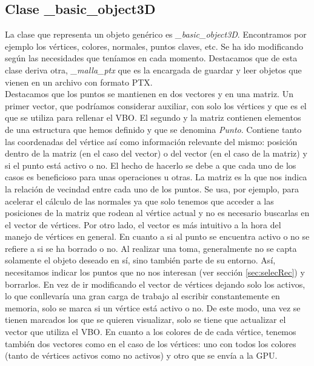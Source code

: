 \subsection{Clase \_basic\_object3D}
La clase que representa un objeto genérico es \textit{\_basic\_object3D}. Encontramos por ejemplo los vértices, colores, normales, puntos claves, etc. Se ha ido modificando según las necesidades que teníamos en cada momento. Destacamos que de esta clase deriva otra, \textit{\_malla\_ptx} que es la encargada de guardar y leer objetos que vienen en un archivo con formato PTX. \\

Destacamos que los puntos se mantienen en dos vectores y en una matriz. Un primer vector, que podríamos considerar auxiliar, con solo los vértices y que es el que se utiliza para rellenar el VBO. El segundo y la matriz contienen elementos de una estructura que hemos definido y que se denomina \textit{Punto}. Contiene tanto las coordenadas del vértice así como información relevante del mismo: posición dentro de la matriz (en el caso del vector) o del vector (en el caso de la matriz) y si el punto está activo o no. El hecho de hacerlo se debe a que cada uno de los casos es beneficioso para unas operaciones u otras. La matriz es la que nos indica la relación de vecindad entre cada uno de los puntos. Se usa, por ejemplo, para acelerar el cálculo de las normales ya que solo tenemos que acceder a las posiciones de la matriz que rodean al vértice actual y no es necesario buscarlas en el vector de vértices. Por otro lado, el vector es más intuitivo a la hora del manejo de vértices en general. En cuanto a si al punto se encuentra activo o no se refiere a si se ha borrado o no. Al realizar una toma, generalmente no se capta solamente el objeto deseado en sí, sino también parte de su entorno. Así, necesitamos indicar los puntos que no nos interesan (ver sección \ref{sec:selecRec}) y borrarlos. En vez de ir modificando el vector de vértices dejando solo los activos, lo que conllevaría una gran carga de trabajo al escribir constantemente en memoria, solo se marca si un vértice está activo o no. De este modo, una vez se tienen marcados los que se quieren visualizar, solo se tiene que actualizar el vector que utiliza el VBO. En cuanto a los colores de de cada vértice, tenemos también dos vectores como en el caso de los vértices: uno con todos los colores (tanto de vértices activos como no activos) y otro que se envía a la GPU.\\

